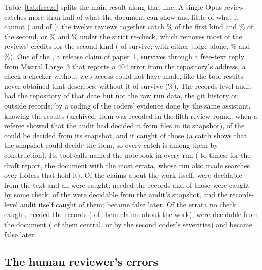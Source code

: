 \documentclass[11pt]{article}
\begin{document}
Table~\ref{tab:freeze} splits the main result along that line. A single Opus review catches more than half of what the document can
show and little of what it cannot (\RecOpusARec{} and \RecOpusBRec{} of \NfreezeRec); the twelve reviews together catch \RecConeDocPct\% of the first kind and \RecConeRecPct\% of
the second, or \StrictRecConeDocPct\% and \StrictRecConeRecPct\% under the strict re-check, which removes most of the reviews' credits
for the second kind (\StrictRecConeRec{} of \RecConeRec{} survive; with either judge alone, \StrictRecConeRecPctGpt\% and
\StrictRecConeRecPctFable\%). One of the \StrictRecConeRec, a release claim of paper~1, survives through a free-text reply from Mistral
Large~3 that reports a 404 error from the repository's address, a check a checker without web access could not have made, like
the tool results never obtained that \citet{gurram2026agentprop} describes; without it \StrictRecConeRecNoFab{} of \NfreezeRec{} survive
(\StrictRecConeRecNoFabPct\%). The records-level audit had the repository of that date but not the raw run data, the git history or outside records;
by a coding of the coders' evidence done by the same assistant, knowing the results (archived; \NrecSnapRevised{} item was recoded in
the fifth review round, when a referee showed that the audit had decided it from files in its snapshot), \NrecSnap{} of the
\NfreezeRec{} could be decided from its snapshot, and it caught \RecCtwoRecSnap{} of those (a catch shows that the snapshot
could decide the item, so every catch is among them by construction). Its tool calls named the notebook in
every run (\CtwoNbMin{} to \CtwoNbMax{} times; \CtwoNbPsix{} for the draft report, the document with the most errata, whose run also
made \CtwoNbPsixDirSearch{} searches over folders that hold it). Of the \NworkClaims{} claims about the work itself,
\NworkClaimsDoc{} were decidable from the text and all were caught; \NworkClaimsRec{} needed the records and \WorkRecCaught{} of those
were caught by some check; \WorkRecSnap{} of the \NworkClaimsRec{} were decidable from the audit's snapshot, and the records-level
audit itself caught \WorkRecSnapCtwo{} of them; \NworkClaimsLater{} became false later. Of the \Nmissed{} errata no check caught,
\MissedRec{} needed the records (\MissedRecWork{} of them claims about the work), \MissedDoc{} were decidable from the document
(\MissedDocGone{} of them central, or \MissedDocGoneB{} by the second coder's severities) and \MissedLater{} became false later.

\subsection{The human reviewer's errors}
\end{document}
